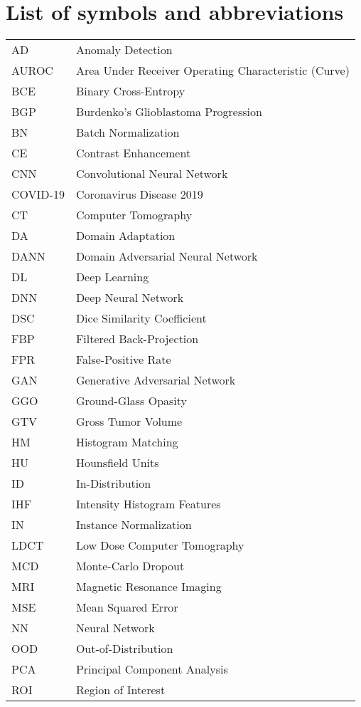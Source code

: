 

\chapter*{List of symbols and abbreviations}

\begin{tabularx}{0.9\textwidth}{lX}
	AD & Anomaly Detection \\
	AUROC & Area Under Receiver Operating Characteristic (Curve) \\
	BCE & Binary Cross-Entropy \\
	BGP & Burdenko’s Glioblastoma Progression \\
	BN & Batch Normalization \\
	CE & Contrast Enhancement \\
	CNN & Convolutional Neural Network \\
	COVID-19 & Coronavirus Disease 2019 \\
	CT & Computer Tomography \\
	DA & Domain Adaptation \\
	DANN & Domain Adversarial Neural Network \\
	DL & Deep Learning \\
	DNN & Deep Neural Network \\
	DSC & Dice Similarity Coefficient \\
	FBP & Filtered Back-Projection \\
	FPR & False-Positive Rate \\
	GAN & Generative Adversarial Network \\
	GGO & Ground-Glass Opasity \\
	GTV & Gross Tumor Volume \\
	HM & Histogram Matching \\
	HU & Hounsfield Units \\
	ID & In-Distribution \\
	IHF & Intensity Histogram Features \\
	IN & Instance Normalization \\
	LDCT & Low Dose Computer Tomography \\
	MCD & Monte-Carlo Dropout \\
	MRI & Magnetic Resonance Imaging \\
	MSE & Mean Squared Error \\
	NN & Neural Network \\
	OOD & Out-of-Distribution \\
	PCA & Principal Component Analysis \\
	ROI & Region of Interest \\
	

\end{tabularx}
